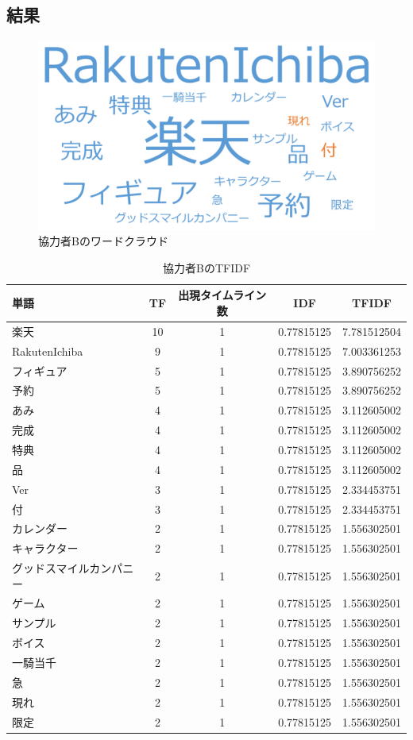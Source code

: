 \subsection{結果}

\begin{figure}[H]
\centering
\includegraphics[width=13cm]{itakura_cloud.png}
\caption{協力者Bのワードクラウド}\label{itakuracloud}
\end{figure}

\begin{table}[H]
	\centering
	\caption{協力者BのTFIDF}
	\begin{tabular}{l|c|c|c|c}
		単語 & TF & 出現タイムライン数 & IDF & TFIDF \\ \hline
		楽天 & 10 & 1 & 0.77815125 & 7.781512504 \\
		RakutenIchiba & 9 & 1 & 0.77815125 & 7.003361253 \\
		フィギュア & 5 & 1 & 0.77815125 & 3.890756252 \\
		予約 & 5 & 1 & 0.77815125 & 3.890756252 \\
		あみ & 4 & 1 & 0.77815125 & 3.112605002 \\
		完成 & 4 & 1 & 0.77815125 & 3.112605002 \\
		特典 & 4 & 1 & 0.77815125 & 3.112605002 \\
		品 & 4 & 1 & 0.77815125 & 3.112605002 \\
		Ver & 3 & 1 & 0.77815125 & 2.334453751 \\
		付 & 3 & 1 & 0.77815125 & 2.334453751 \\
		カレンダー & 2 & 1 & 0.77815125 & 1.556302501 \\
		キャラクター & 2 & 1 & 0.77815125 & 1.556302501 \\
		グッドスマイルカンパニー & 2 & 1 & 0.77815125 & 1.556302501 \\
		ゲーム & 2 & 1 & 0.77815125 & 1.556302501 \\
		サンプル & 2 & 1 & 0.77815125 & 1.556302501 \\
		ボイス & 2 & 1 & 0.77815125 & 1.556302501 \\
		一騎当千 & 2 & 1 & 0.77815125 & 1.556302501 \\
		急 & 2 & 1 & 0.77815125 & 1.556302501 \\
		現れ & 2 & 1 & 0.77815125 & 1.556302501 \\
		限定 & 2 & 1 & 0.77815125 & 1.556302501
	\end{tabular}
\end{table}

